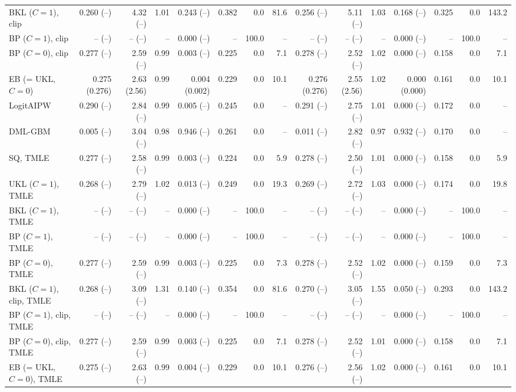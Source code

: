\begin{tabular}{lrrrrrrrrrrrrrr}
BKL ($C=1$), clip & 0.260 (--) & 4.32 (--) & 1.01 & 0.243 (--) & 0.382 & 0.0 & 81.6 & 0.256 (--) & 5.11 (--) & 1.03 & 0.168 (--) & 0.325 & 0.0 & 143.2 \\
BP ($C=1$), clip & -- (--) & -- (--) & -- & 0.000 (--) & -- & 100.0 & -- & -- (--) & -- (--) & -- & 0.000 (--) & -- & 100.0 & -- \\
BP ($C=0$), clip & 0.277 (--) & 2.59 (--) & 0.99 & 0.003 (--) & 0.225 & 0.0 & 7.1 & 0.278 (--) & 2.52 (--) & 1.02 & 0.000 (--) & 0.158 & 0.0 & 7.1 \\
EB (= UKL, $C=0$) & 0.275 (0.276) & 2.63 (2.56) & 0.99 & 0.004 (0.002) & 0.229 & 0.0 & 10.1 & 0.276 (0.276) & 2.55 (2.56) & 1.02 & 0.000 (0.000) & 0.161 & 0.0 & 10.1 \\
LogitAIPW & 0.290 (--) & 2.84 (--) & 0.99 & 0.005 (--) & 0.245 & 0.0 & -- & 0.291 (--) & 2.75 (--) & 1.01 & 0.000 (--) & 0.172 & 0.0 & -- \\
DML-GBM & 0.005 (--) & 3.04 (--) & 0.98 & 0.946 (--) & 0.261 & 0.0 & -- & 0.011 (--) & 2.82 (--) & 0.97 & 0.932 (--) & 0.170 & 0.0 & -- \\
SQ, TMLE & 0.277 (--) & 2.58 (--) & 0.99 & 0.003 (--) & 0.224 & 0.0 & 5.9 & 0.278 (--) & 2.50 (--) & 1.01 & 0.000 (--) & 0.158 & 0.0 & 5.9 \\
UKL ($C=1$), TMLE & 0.268 (--) & 2.79 (--) & 1.02 & 0.013 (--) & 0.249 & 0.0 & 19.3 & 0.269 (--) & 2.72 (--) & 1.03 & 0.000 (--) & 0.174 & 0.0 & 19.8 \\
BKL ($C=1$), TMLE & -- (--) & -- (--) & -- & 0.000 (--) & -- & 100.0 & -- & -- (--) & -- (--) & -- & 0.000 (--) & -- & 100.0 & -- \\
BP ($C=1$), TMLE & -- (--) & -- (--) & -- & 0.000 (--) & -- & 100.0 & -- & -- (--) & -- (--) & -- & 0.000 (--) & -- & 100.0 & -- \\
BP ($C=0$), TMLE & 0.277 (--) & 2.59 (--) & 0.99 & 0.003 (--) & 0.225 & 0.0 & 7.3 & 0.278 (--) & 2.52 (--) & 1.02 & 0.000 (--) & 0.159 & 0.0 & 7.3 \\
BKL ($C=1$), clip, TMLE & 0.268 (--) & 3.09 (--) & 1.31 & 0.140 (--) & 0.354 & 0.0 & 81.6 & 0.270 (--) & 3.05 (--) & 1.55 & 0.050 (--) & 0.293 & 0.0 & 143.2 \\
BP ($C=1$), clip, TMLE & -- (--) & -- (--) & -- & 0.000 (--) & -- & 100.0 & -- & -- (--) & -- (--) & -- & 0.000 (--) & -- & 100.0 & -- \\
BP ($C=0$), clip, TMLE & 0.277 (--) & 2.59 (--) & 0.99 & 0.003 (--) & 0.225 & 0.0 & 7.1 & 0.278 (--) & 2.52 (--) & 1.01 & 0.000 (--) & 0.158 & 0.0 & 7.1 \\
EB (= UKL, $C=0$), TMLE & 0.275 (--) & 2.63 (--) & 0.99 & 0.004 (--) & 0.229 & 0.0 & 10.1 & 0.276 (--) & 2.56 (--) & 1.02 & 0.000 (--) & 0.161 & 0.0 & 10.1 \\
\hline
\end{tabular}
